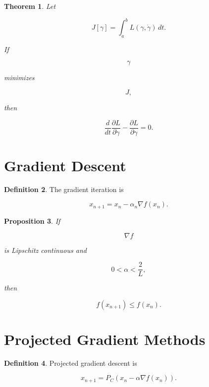 \documentclass[11pt]{book}
\numberwithin{equation}{chapter}
\theoremstyle{definition}
\newtheorem{definition}{Definition}[chapter]
\theoremstyle{plain}
\newtheorem{theorem}[definition]{Theorem}
\newtheorem{proposition}[definition]{Proposition}
\begin{document}
\begin{theorem}

Let

\[
J[\gamma]
=
\int_a^b
L(\gamma,\dot\gamma)\,dt.
\]

If

\[
\gamma
\]

minimizes

\[
J,
\]

then

\[
\frac{d}{dt}
\frac{\partial L}{\partial\dot\gamma}
-
\frac{\partial L}{\partial\gamma}
=
0.
\]

\end{theorem}


\section{Gradient Descent}

\begin{definition}

The gradient iteration is

\[
x_{n+1}
=
x_n
-
\alpha_n
\nabla f(x_n).
\]

\end{definition}


\begin{proposition}

If

\[
\nabla f
\]

is Lipschitz continuous and

\[
0<\alpha<\frac{2}{L},
\]

then

\[
f(x_{n+1})
\le
f(x_n).
\]

\end{proposition}


\section{Projected Gradient Methods}

\begin{definition}

Projected gradient descent is

\[
x_{n+1}
=
P_C
\left(
x_n
-
\alpha
\nabla f(x_n)
\right).
\]

\end{definition}
\end{document}
